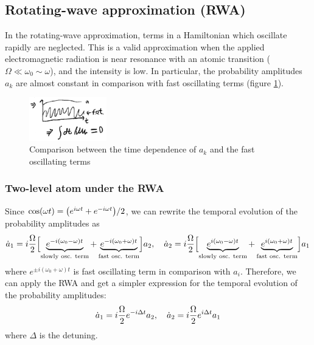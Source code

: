 \subsection[Rotating-wave approximation]{Rotating-wave approximation (RWA)}
In the rotating-wave approximation, terms in a Hamiltonian which oscillate rapidly are neglected. This is a valid approximation when the applied electromagnetic radiation is near resonance with an atomic transition ($\Omega \ll \omega_{0} \sim \omega$), and the intensity is low. In particular, the probability amplitudes $a_{k}$ are almost constant in comparison with fast oscillating terms (figure \ref{fig:rwa}).
\begin{figure}[H]
	\centering
	\includegraphics[width=0.3\textwidth]{./images/3-rwa}
	\caption{Comparison between the time dependence of $a_{k}$ and the fast oscillating terms}
	\label{fig:rwa}
\end{figure}

\subsubsection*{Two-level atom under the RWA}
Since $\cos(\omega t) = \qty(e^{i \omega t} + e^{-i \omega t})/2$, we can rewrite the temporal evolution of the probability amplitudes as
\begin{align*}
	\dot{a}_{1} = i \frac{\Omega}{2} \qty\Big[\underbrace{e^{-i (\omega_{0} - \omega) t}}_{\text{slowly osc. term}} + \underbrace{e^{-i (\omega_{0} + \omega) t}}_{\text{fast osc. term}}] a_{2} \qc
	\dot{a}_{2} = i \frac{\Omega}{2} \qty\Big[\underbrace{e^{i (\omega_{0} - \omega) t}}_{\text{slowly osc. term}} + \underbrace{e^{i (\omega_{0} + \omega) t}}_{\text{fast osc. term}}] a_{1}
\end{align*}
where $e^{\pm i (\omega_{0} + \omega) t}$ is fast oscillating term in comparison with $a_{i}$. Therefore, we can apply the RWA and get a simpler expression for the temporal evolution of the probability amplitudes:
\begin{align}\label{eq:rwa-dot-a}
	\dot{a}_{1} = i \frac{\Omega}{2} e^{-i \Delta t} a_{2} \qc \dot{a}_{2} = i \frac{\Omega}{2} e^{i \Delta t} a_{1}
\end{align}
where $\Delta$ is the detuning.

